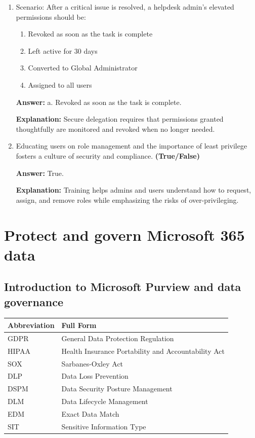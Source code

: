 \documentclass[10pt]{article}
\begin{document}
\begin{enumerate}[leftmargin=*]
\textbf{Explanation:} Custom roles allow selection of only the exact permissions required for the contractor’s tasks.

\item Scenario: After a critical issue is resolved, a helpdesk admin’s elevated permissions should be:
\begin{enumerate}[label=\alph*., leftmargin=1.5em]
\item Revoked as soon as the task is complete
\item Left active for 30 days
\item Converted to Global Administrator
\item Assigned to all users
\end{enumerate}
\textbf{Answer:} a. Revoked as soon as the task is complete.

\textbf{Explanation:} Secure delegation requires that permissions granted thoughtfully are monitored and revoked when no longer needed.

\item Educating users on role management and the importance of least privilege fosters a culture of security and compliance. \textbf{(True/False)}

\textbf{Answer:} True.

\textbf{Explanation:} Training helps admins and users understand how to request, assign, and remove roles while emphasizing the risks of over-privileging.

\end{enumerate}
\clearpage

\section{Protect and govern Microsoft 365 data}
\clearpage
\subsection{Introduction to Microsoft Purview and data governance}
\begin{center}
\begin{tabular}{>{\raggedright\arraybackslash}p{} >{\raggedright\arraybackslash}p{}}
\toprule
\textbf{Abbreviation} & \textbf{Full Form} \\
\midrule
GDPR & General Data Protection Regulation \\
HIPAA & Health Insurance Portability and Accountability Act \\
SOX & Sarbanes-Oxley Act \\
DLP & Data Loss Prevention \\
DSPM & Data Security Posture Management \\
DLM & Data Lifecycle Management \\
EDM & Exact Data Match \\
SIT & Sensitive Information Type \\
\end{tabular}
\end{center}
\end{document}
